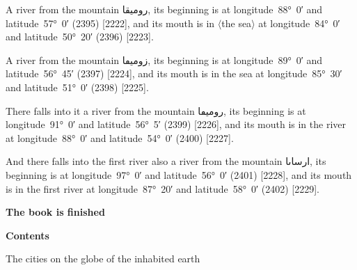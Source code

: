 \documentclass[11pt]{article}
\newcommand{\Pg}[1]{\marginpar{\footnotesize #1}}
\newcommand{\Ang}[1]{\ensuremath{#1}}
\begin{document}
A river from the mountain \textarabic{روميقا}, its beginning is at longitude~88°~0′ and latitude~57°~0′ (2395) [2222], and its mouth is in \Ang{\langle}the sea\Ang{\rangle} at longitude~84°~0′ and latitude~50°~20′ (2396) [2223].

A river from the mountain \textarabic{زوميڡا}, its beginning is at longitude~89°~0′ and latitude~56°~45′ (2397) [2224], and its mouth is in the sea at longitude~85°~30′ and latitude~51°~0′ (2398) [2225].

There falls into it a river from the mountain \textarabic{روميڡا}, its beginning is at longitude~91°~0′ and latitude~56°~5′ (2399) [2226], and its mouth is in the river at longitude~88°~0′ and latitude~54°~0′ (2400) [2227].

And there falls into the first river also a river from the mountain \textarabic{ارساٮا}, its beginning is at longitude~97°~0′ and latitude~56°~0′ (2401) [2228], and its mouth is in the first river at longitude~87°~20′ and latitude~58°~0′ (2402) [2229].

\par\medskip\begin{center}\bfseries The book is finished\end{center}\par

\par\medskip\begin{center}\Pg{p. 159}\bfseries Contents\end{center}\par

\begin{center}The cities on the globe of the inhabited earth\end{center}

\par{}\par

\par{}\par

\par{}\par
\end{document}
